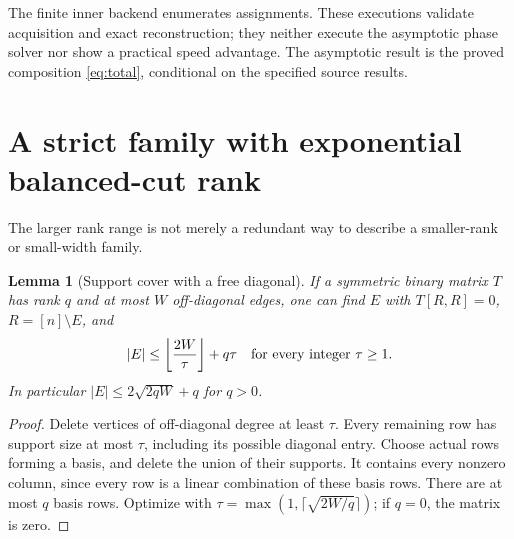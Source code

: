\documentclass[11pt,a4paper]{article}
\newtheorem{lemma}[theorem]{Lemma}
\theoremstyle{remark}\newtheorem{remark}[theorem]{Remark}
\begin{document}
The finite inner backend enumerates assignments. These
executions validate acquisition and exact reconstruction;
they neither execute the asymptotic phase solver nor show
a practical speed advantage. The asymptotic result is the
proved composition \eqref{eq:total}, conditional on the
specified source results.

\section{A strict family with exponential balanced-cut rank}
\label{sec:strict}
The larger rank range is not merely a redundant way to
describe a smaller-rank or small-width family.

\begin{lemma}[Support cover with a free diagonal]\label{lem:cover}
If a symmetric binary matrix $T$ has rank $q$ and at most
$W$ off-diagonal edges, one can find $E$ with
$T[R,R]=0$, $R=[n]\setminus E$, and
\[
|E|\le\left\lfloor\frac{2W}{\tau}\right\rfloor+q\tau
\quad\hbox{for every integer }\tau\ge1.
\]
In particular $|E|\le 2\sqrt{2qW}+q$ for $q>0$.
\end{lemma}
\begin{proof}
Delete vertices of off-diagonal degree at least $\tau$.
Every remaining row has support size at most $\tau$,
including its possible diagonal entry. Choose actual
rows forming a basis, and delete the union of their
supports. It contains every nonzero column, since every
row is a linear combination of these basis rows.
There are at most $q$ basis rows. Optimize with
$\tau=\max(1,\lceil\sqrt{2W/q}\rceil)$; if $q=0$,
the matrix is zero.
\end{proof}
\end{document}

